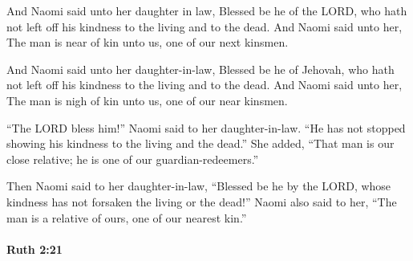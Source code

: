 			And Naomi said unto her daughter in law, Blessed be he of the LORD, who hath not left off his kindness to the living and to the dead. And Naomi said unto her, The man is near of kin unto us, one of our next kinsmen.

			\begin{versebox}
					\item[BHS] 
					\item[LXX] 
					\item[ASV] And Naomi said unto her daughter-in-law, Blessed be he of Jehovah, who hath not left off his kindness to the living and to the dead. And Naomi said unto her, The man is nigh of kin unto us, one of our near kinsmen.
					\item[NIV] “The LORD bless him!” Naomi said to her daughter-in-law. “He has not stopped showing his kindness to the living and the dead.” She added, “That man is our close relative; he is one of our guardian-redeemers.”
					\item[NRSV] Then Naomi said to her daughter-in-law, “Blessed be he by the LORD, whose kindness has not forsaken the living or the dead!” Naomi also said to her, “The man is a relative of ours, one of our nearest kin.”
			\end{versebox}

		\paragraph{Ruth 2:21} %
			\label{RUTH-2-21}

